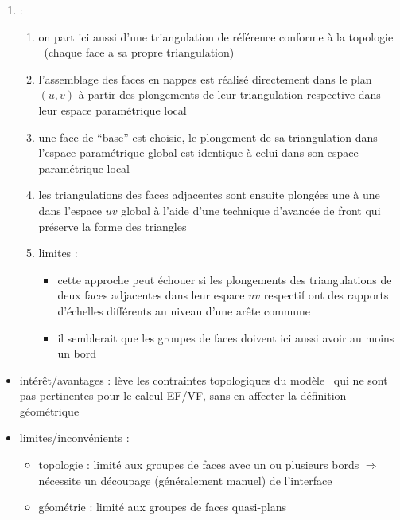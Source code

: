 \begin{enumerate}
\begin{enumerate}
\begin{enumerate}
				\item \cite{jones2004} :
				\begin{enumerate}
					\item on part ici aussi d'une triangulation de référence conforme à la topologie \brep\ (\ie chaque face a sa propre triangulation)
					\item l'assemblage des faces en nappes est réalisé directement dans le plan $(u,v)$ à partir des plongements de leur triangulation respective dans leur espace paramétrique local
					\item une face de ``base'' est choisie, le plongement de sa triangulation dans l'espace paramétrique global est identique à celui dans son espace paramétrique local
					\item les triangulations des faces adjacentes sont ensuite plongées une à une dans l'espace $uv$ global à l'aide d'une technique d'avancée de front qui préserve la forme des triangles
					\item limites : 
					\begin{itemize}
						\item cette approche peut échouer si les plongements des triangulations de deux faces adjacentes dans leur espace $uv$ respectif ont des rapports d'échelles différents au niveau d'une arête commune %
						\item il semblerait que les groupes de faces doivent ici aussi avoir au moins un bord
					\end{itemize}
					
				\end{enumerate}
			\end{enumerate}
		\begin{itemize}
			\item intérêt/avantages : lève les contraintes topologiques du modèle \brep\ qui ne sont pas pertinentes pour le calcul EF/VF, sans en affecter la définition géométrique
			\item limites/inconvénients : 
			\begin{itemize}
				\item topologie : limité aux groupes de faces avec un ou plusieurs bords $\Rightarrow$ nécessite un découpage (généralement manuel) de l'interface
				\item géométrie : limité aux groupes de faces quasi-plans
			\end{itemize}
			
		\end{itemize}
	\end{enumerate}
	

\end{enumerate}
